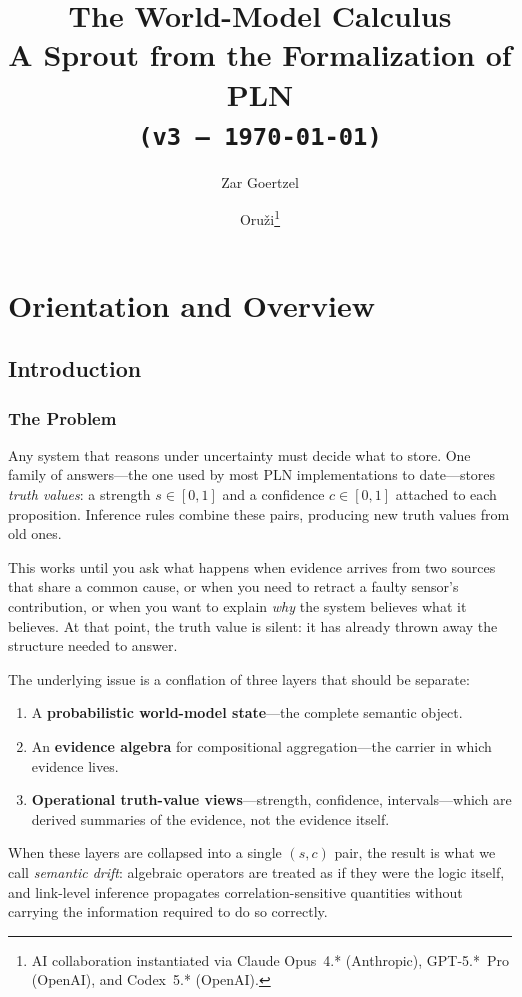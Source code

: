 \documentclass[11pt,openany]{report}
\title{The World-Model Calculus\\[6pt]
  \large A Sprout from the Formalization of PLN\\[12pt]
  \normalsize\texttt{(v3 --- \today)}}
\author{Zar Goertzel \and Oru\v{z}i\thanks{%
  AI collaboration instantiated via
  Claude Opus~4.* (Anthropic),
  GPT-5.*~Pro (OpenAI),
  and Codex~5.* (OpenAI).}}
\date{}
\begin{document}
\maketitle
\tableofcontents


\part{Orientation and Overview}
\label{part:orientation}

\chapter{Introduction}
\label{ch:introduction}

\section{The Problem}

Any system that reasons under uncertainty must decide what to
store.  One family of answers---the one used by most PLN
implementations to date---stores \emph{truth values}: a strength
$s \in [0,1]$ and a confidence $c \in [0,1]$ attached to each
proposition.  Inference rules combine these pairs, producing new
truth values from old ones.

This works until you ask what happens when evidence arrives from
two sources that share a common cause, or when you need to retract
a faulty sensor's contribution, or when you want to explain
\emph{why} the system believes what it believes.  At that point,
the truth value is silent: it has already thrown away the structure
needed to answer.

The underlying issue is a conflation of three layers that should
be separate:
\begin{enumerate}
\item A \textbf{probabilistic world-model state}---the complete
  semantic object.
\item An \textbf{evidence algebra} for compositional
  aggregation---the carrier in which evidence lives.
\item \textbf{Operational truth-value views}---strength,
  confidence, intervals---which are derived summaries of the
  evidence, not the evidence itself.
\end{enumerate}
When these layers are collapsed into a single $(s, c)$ pair, the
result is what we call \emph{semantic drift}: algebraic operators
are treated as if they were the logic itself, and link-level
inference propagates correlation-sensitive quantities without
carrying the information required to do so correctly.
\end{document}
